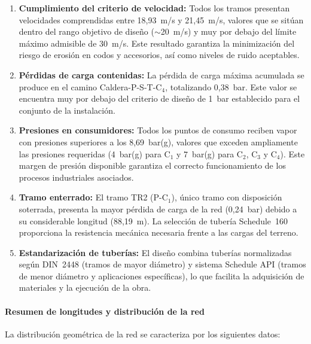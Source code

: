 \begin{enumerate}[label=\arabic*., leftmargin=2em]
	\item \textbf{Cumplimiento del criterio de velocidad:} Todos los tramos presentan velocidades comprendidas entre 18,93~m/s y 21,45~m/s, valores que se sitúan dentro del rango objetivo de diseño ($\sim$20~m/s) y muy por debajo del límite máximo admisible de 30~m/s. Este resultado garantiza la minimización del riesgo de erosión en codos y accesorios, así como niveles de ruido aceptables.

	\item \textbf{Pérdidas de carga contenidas:} La pérdida de carga máxima acumulada se produce en el camino Caldera-P-S-T-C$_4$, totalizando 0,38~bar. Este valor se encuentra muy por debajo del criterio de diseño de 1~bar establecido para el conjunto de la instalación.

	\item \textbf{Presiones en consumidores:} Todos los puntos de consumo reciben vapor con presiones superiores a los 8,69~bar(g), valores que exceden ampliamente las presiones requeridas (4~bar(g) para C$_1$ y 7~bar(g) para C$_2$, C$_3$ y C$_4$). Este margen de presión disponible garantiza el correcto funcionamiento de los procesos industriales asociados.

	\item \textbf{Tramo enterrado:} El tramo TR2 (P-C$_1$), único tramo con disposición soterrada, presenta la mayor pérdida de carga de la red (0,24~bar) debido a su considerable longitud (88,19~m). La selección de tubería Schedule~160 proporciona la resistencia mecánica necesaria frente a las cargas del terreno.

	\item \textbf{Estandarización de tuberías:} El diseño combina tuberías normalizadas según DIN~2448 (tramos de mayor diámetro) y sistema Schedule API (tramos de menor diámetro y aplicaciones específicas), lo que facilita la adquisición de materiales y la ejecución de la obra.
\end{enumerate}

\paragraph{Resumen de longitudes y distribución de la red}

La distribución geométrica de la red se caracteriza por los siguientes datos:

